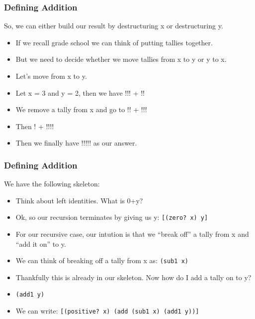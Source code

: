 \documentclass{beamer}
\begin{document}
\begin{frame}
  \frametitle{Defining Addition}
  So, we can either build our result by destructuring
  x or destructuring y.
  \begin{itemize}
  \item<2-> If we recall grade school we can think of putting
    tallies together.
  \item<3-> But we need to decide whether we move tallies from x to
    y or y to x.
  \item<4-> Let's move from x to y.
  \item<5-> Let x = 3 and y = 2, then we have !!! + !!
  \item<6-> We remove a tally from x and go to !! + !!!
  \item<7-> Then ! + !!!!
  \item<8-> Then  we finally have !!!!! as our answer.
  \end{itemize}
\end{frame}


\begin{frame}
  \frametitle{Defining Addition}
  We have the following skeleton:
  \addSkeleton
  \begin{itemize}
  \item<2-> Think about left identities. What is 0+y?
  \item<3-> Ok, so our recursion terminates by giving us y:
    \texttt{[(zero? x) y]}
  \item<4-> For our recursive case, our intution is that we
    ``break off'' a tally from x and ``add it on'' to y.
  \item<5-> We can think of breaking off a tally from x as:
    \texttt{(sub1 x)}
  \item<6-> Thankfully this is already in our skeleton. Now how do I
    add a tally on to y?
  \item<7-> \texttt{(add1 y)}
  \item<8-> We can write:
    \texttt{[(positive? x) (add (sub1 x) (add1 y))]}  
  \end{itemize}
\end{frame}

\end{document}
